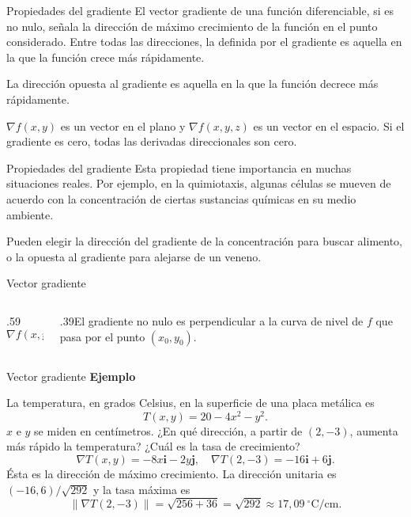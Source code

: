 \documentclass[original_version/main.tex]{subfiles}
\begin{document}
\begin{frame}{Propiedades del gradiente}
\small El vector gradiente de una función diferenciable, si es no nulo, señala la dirección de máximo crecimiento de la función en el punto considerado. Entre todas las direcciones, la definida por el gradiente es aquella en la que la función crece más rápidamente.
\medskip

La dirección opuesta al gradiente es aquella en la que la función decrece más rápidamente.
\medskip

$\nabla f(x,y)$ es un vector en el plano y $\nabla f(x,y,z)$ es un vector en el espacio. Si el gradiente es cero, todas las derivadas direccionales son cero.
\end{frame}
\begin{frame}{Propiedades del gradiente}
Esta propiedad tiene importancia en muchas situaciones reales. Por ejemplo, en la quimiotaxis, algunas células se mueven de acuerdo con la concentración de ciertas sustancias químicas en su medio ambiente.
\medskip

Pueden elegir la dirección del gradiente de la concentración para buscar alimento, o la opuesta al gradiente para alejarse de un veneno.
\end{frame}
\begin{frame}{Vector gradiente}
\begin{columns}[c]
\begin{column}{.59\textwidth}\[\nabla f(x,y)\]\end{column}
\begin{column}{.39\textwidth}El gradiente no nulo es perpendicular a la curva de nivel de $f$ que pasa por el punto $(x_0,y_0)$.\end{column}
\end{columns}
\end{frame}
\begin{frame}{Vector gradiente}
\small\textbf{Ejemplo}\par La temperatura, en grados Celsius, en la superficie de una placa metálica es
\[T(x,y)=20-4x^2-y^2.\]
$x$ e $y$ se miden en centímetros. ¿En qué dirección, a partir de $(2,-3)$, aumenta más rápido la temperatura? ¿Cuál es la tasa de crecimiento?
\[\nabla T(x,y)=-8x\mathbf i-2y\mathbf j,\quad\nabla T(2,-3)=-16\mathbf i+6\mathbf j.\]
Ésta es la dirección de máximo crecimiento. La dirección unitaria es $(-16,6)/\sqrt{292}$ y la tasa máxima es
\[\|\nabla T(2,-3)\|=\sqrt{256+36}=\sqrt{292}\approx17{,}09\ ^\circ\mathrm C/\mathrm{cm}.\]
\end{frame}
\end{document}
